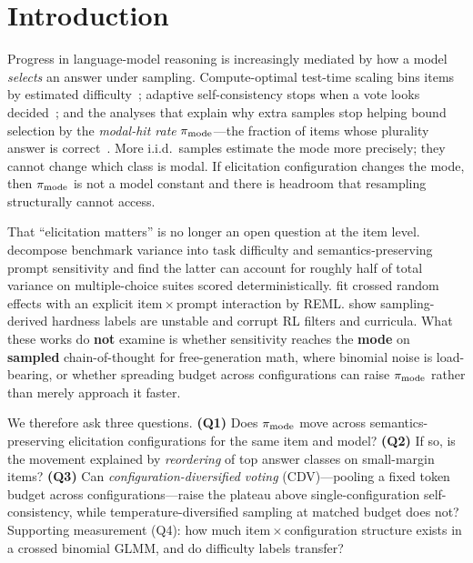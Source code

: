 \section{Introduction}

Progress in language-model reasoning is increasingly mediated by how a model
\emph{selects} an answer under sampling. Compute-optimal test-time scaling
bins items by estimated difficulty~\citep{snell2024scaling}; adaptive
self-consistency stops when a vote looks decided~\citep{aggarwal2023adaptive,li2024esc};
and the analyses that explain why extra samples stop helping bound selection by
the \emph{modal-hit rate} $\pi_{\mathrm{mode}}$---the fraction of items whose plurality
answer is correct~\citep{brown2024monkeys,blendasc2025,certifiedsc2025}.
More i.i.d.\ samples estimate the mode more precisely; they cannot change which
class is modal. If elicitation configuration changes the mode, then $\pi_{\mathrm{mode}}$ is
not a model constant and there is headroom that resampling structurally cannot
access.

That ``elicitation matters'' is no longer an open question at the item level.
\citet{brittlebench2026} decompose benchmark variance into task difficulty and
semantics-preserving prompt sensitivity and find the latter can account for
roughly half of total variance on multiple-choice suites scored deterministically.
\citet{tee2026} fit crossed random effects with an explicit item\,$\times$\,prompt
interaction by REML. \citet{hardunreached2026} show sampling-derived hardness
labels are unstable and corrupt RL filters and curricula. What these works do
\textbf{not} examine is whether sensitivity reaches the \textbf{mode} on
\textbf{sampled} chain-of-thought for free-generation math, where binomial noise
is load-bearing, or whether spreading budget across configurations can raise
$\pi_{\mathrm{mode}}$ rather than merely approach it faster.

We therefore ask three questions. \textbf{(Q1)} Does $\pi_{\mathrm{mode}}$ move across
semantics-preserving elicitation configurations for the same item and model?
\textbf{(Q2)} If so, is the movement explained by \emph{reordering} of top
answer classes on small-margin items? \textbf{(Q3)} Can
\emph{configuration-diversified voting} (CDV)---pooling a fixed token budget
across configurations---raise the plateau above single-configuration
self-consistency, while temperature-diversified sampling at matched budget does
not? Supporting measurement (Q4): how much item\,$\times$\,configuration
structure exists in a crossed binomial GLMM, and do difficulty labels transfer?

